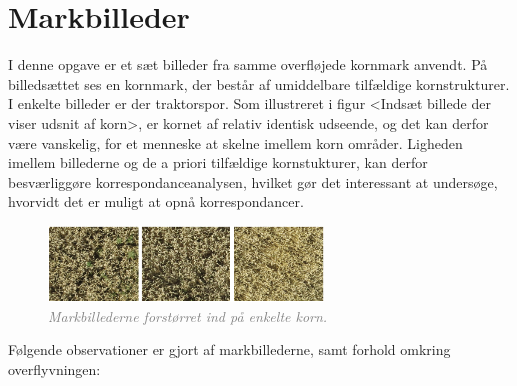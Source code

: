 \section{Markbilleder}
I denne opgave er et sæt billeder fra samme overfløjede kornmark anvendt. På billedsættet ses en kornmark, der består af umiddelbare tilfældige kornstrukturer. I enkelte billeder er der traktorspor. Som illustreret i figur <Indsæt billede der viser udsnit af korn>, er kornet af relativ identisk udseende, og det kan derfor være vanskelig, for et menneske at skelne imellem korn områder. Ligheden imellem billederne og de a priori tilfældige kornstukturer, kan derfor besværliggøre korrespondanceanalysen, hvilket gør det interessant at undersøge, hvorvidt det er muligt at opnå korrespondancer.
\begin{figure}[H]
    \centering
    \includegraphics[width=0.65\textwidth]{fig/20.png}
    \begin{center}    
       \caption{\textcolor{gray}{\footnotesize \textit{Markbillederne forstørret ind på enkelte korn.}}}
    \label{fig:korn}
     \end{center}
     \vspace{-2.5em}
  \end{figure} \noindent
Følgende observationer er gjort af markbillederne, samt forhold omkring overflyvningen:
